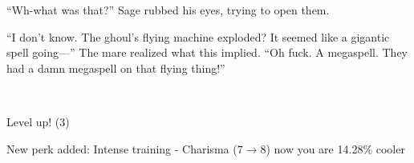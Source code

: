 ``Wh-what was that?'' Sage rubbed his eyes, trying to open them.

``I don't know. The ghoul's flying machine exploded? It seemed like a gigantic spell going---'' The mare realized what this implied. ``Oh fuck. A megaspell. They had a damn megaspell on that flying thing!''

\clearpage

~\vfill


\begin{engnote}
	Level up! (3)

	New perk added: Intense training - Charisma ($7 \to 8$) now you are 14.28\% cooler
\end{engnote}

